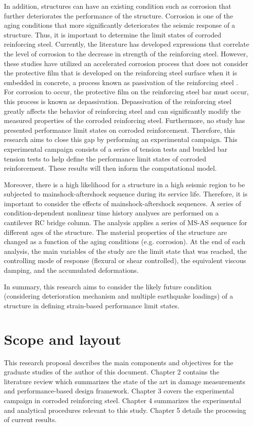 In addition, structures can have an existing condition such as corrosion that further deteriorates the performance of the structure. Corrosion is one of the aging conditions that more significantly deteriorates the seismic response of a structure. Thus, it is important to determine the limit states of corroded reinforcing steel. Currently, the literature has developed expressions that correlate the level of corrosion to the decrease in strength of the reinforcing steel\cite{Yuan2017a}\cite{Du2005}. However, these studies have utilized an accelerated corrosion process that does not consider the protective film that is developed on the reinforcing steel surface when it is embedded in concrete, a process known as passivation of the reinforcing steel \cite{Mehta2014}\cite{Ghods2009}. For corrosion to occur, the protective film on the reinforcing steel bar must occur, this process is known as  depassivation. Depassivation of the reinforcing steel greatly affects the behavior of reinforcing steel and can significantly modify the measured properties of the corroded reinforcing steel. Furthermore, no study has presented performance limit states on corroded reinforcement. Therefore, this research aims to close this gap by performing an experimental campaign. This experimental campaign consists of a series of tension tests and buckled bar tension tests to help define the performance limit states of corroded reinforcement. These results will then inform the computational model.

Moreover, there is a high likelihood for a structure in a high seismic region to be subjected to mainshock-aftershock sequence during its service life. Therefore, it is important to consider the effects of mainshock-aftershock sequences. A series of condition-dependent nonlinear time history analyses are performed on a cantilever RC bridge column. The analysis applies a series of MS-AS sequence for different ages of the structure. The material properties of the structure are changed as a function of the aging conditions (e.g. corrosion). At the end of each analysis, the main variables of the study are the limit state that was reached, the controlling mode of response (flexural or shear controlled), the equivalent viscous damping, and the accumulated deformations.

In summary, this research aims to consider the likely future condition (considering deterioration mechanism and multiple earthquake loadings) of a structure in defining strain-based performance limit states.

\section{Scope and layout}
This research proposal describes the main components and objectives for the graduate studies of the author of this document. Chapter 2 contains the literature review which summarizes the state of the art in damage measurements and performance-based design framework. Chapter 3 covers the experimental campaign in corroded reinforcing steel. Chapter 4 summarizes the experimental and analytical procedures relevant to this study. Chapter 5 details the processing of current results. 